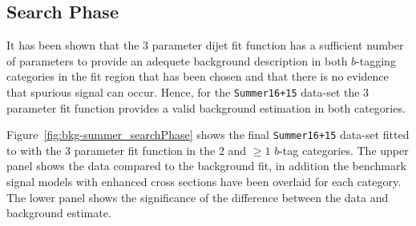 \subsection{Search Phase}
\label{sec:bkg-summer_results}

It has been shown that the 3 parameter dijet fit function has a
sufficient number of parameters to provide an adequete background
description in both $b$-tagging categories in the fit region that has been chosen
and that there is no evidence that spurious signal can occur.
Hence, for the \verb|Summer16+15| data-set the 3 parameter fit function
provides a valid background estimation in both categories.

Figure~\ref{fig:bkg-summer_searchPhase} shows the final
\verb|Summer16+15| data-set fitted to with the 3 parameter fit function
in the 2 and $\geq1$ $b$-tag categories.
The upper panel shows the data compared to the background fit,
in addition the benchmark signal models with enhanced cross sections have been overlaid for each category.
The lower panel shows the significance of the difference between the data and background estimate.


